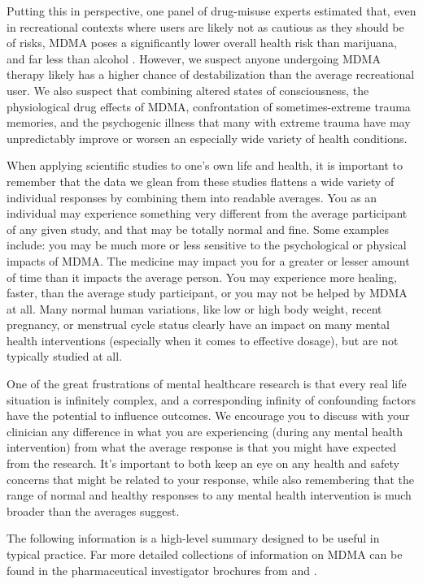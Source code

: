 \documentclass[12pt,letterpaper]{book}
\begin{document}
Putting this in perspective, one panel of drug-misuse experts estimated that, even in recreational contexts where users are likely not as cautious as they should be of risks, MDMA poses a significantly lower overall health risk than marijuana, and far less than alcohol \cite{nuttDrugHarms}. However, we suspect anyone undergoing MDMA therapy likely has a higher chance of destabilization than the average recreational user. We also suspect that combining altered states of consciousness, the physiological drug effects of MDMA, confrontation of sometimes-extreme trauma memories, and the psychogenic illness that many with extreme trauma have may unpredictably improve or worsen an especially wide variety of health conditions.

When applying scientific studies to one's own life and health, it is important to remember that the data we glean from these studies flattens a wide variety of individual responses by combining them into readable averages. You as an individual may experience something very different from the average participant of any given study, and that may be totally normal and fine. Some examples include: you may be much more or less sensitive to the psychological or physical impacts of MDMA. The medicine may impact you for a greater or lesser amount of time than it impacts the average person. You may experience more healing, faster, than the average study participant, or you may not be helped by MDMA at all. Many normal human variations, like low or high body weight, recent pregnancy, or menstrual cycle status clearly have an impact on many mental health interventions (especially when it comes to effective dosage), but are not typically studied at all.

One of the great frustrations of mental healthcare research is that every real life situation is infinitely complex, and a corresponding infinity of confounding factors have the potential to influence outcomes. We encourage you to discuss with your clinician any difference in what you are experiencing (during any mental health intervention) from what the average response is that you might have expected from the research. It's important to both keep an eye on any health and safety concerns that might be related to your response, while also remembering that the range of normal and healthy responses to any mental health intervention is much broader than the averages suggest.

The following information is a high-level summary designed to be useful in typical practice. Far more detailed collections of information on MDMA can be found in the pharmaceutical investigator brochures from \textcite{mapsInvestigatorBrochure} and \textcite{pharmalaInvestigatorBrochure}.
\end{document}
